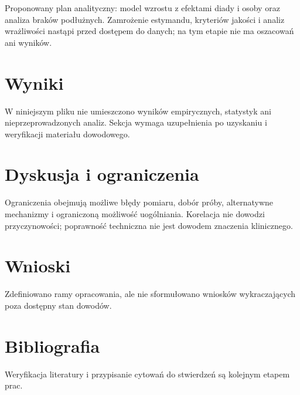 \documentclass[11pt,a4paper]{article}
\begin{document}
Proponowany plan analityczny: model wzrostu z efektami diady i osoby oraz analiza braków podłużnych. Zamrożenie estymandu, kryteriów jakości i analiz wrażliwości nastąpi przed dostępem do danych; na tym etapie nie ma oszacowań ani wyników.

\section{Wyniki}

W niniejszym pliku nie umieszczono wyników empirycznych, statystyk ani nieprzeprowadzonych analiz. Sekcja wymaga uzupełnienia po uzyskaniu i weryfikacji materiału dowodowego.

\section{Dyskusja i ograniczenia}

Ograniczenia obejmują możliwe błędy pomiaru, dobór próby, alternatywne mechanizmy i ograniczoną możliwość uogólniania. Korelacja nie dowodzi przyczynowości; poprawność techniczna nie jest dowodem znaczenia klinicznego.

\section{Wnioski}

Zdefiniowano ramy opracowania, ale nie sformułowano wniosków wykraczających poza dostępny stan dowodów.

\section*{Bibliografia}

Weryfikacja literatury i przypisanie cytowań do stwierdzeń są kolejnym etapem prac.
\end{document}
